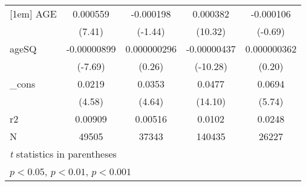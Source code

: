 \begin{table}[htbp]
\begin{tabular}{l*{4}{c}}
[1em]
AGE         &    0.000559\sym{***}&   -0.000198         &    0.000382\sym{***}&   -0.000106         \\
            &      (7.41)         &     (-1.44)         &     (10.32)         &     (-0.69)         \\
[1em]
ageSQ       & -0.00000899\sym{***}& 0.000000296         & -0.00000437\sym{***}& 0.000000362         \\
            &     (-7.69)         &      (0.26)         &    (-10.28)         &      (0.20)         \\
[1em]
\_cons      &      0.0219\sym{***}&      0.0353\sym{***}&      0.0477\sym{***}&      0.0694\sym{***}\\
            &      (4.58)         &      (4.64)         &     (14.10)         &      (5.74)         \\
\hline
r2          &     0.00909         &     0.00516         &      0.0102         &      0.0248         \\
N           &       49505         &       37343         &      140435         &       26227         \\
\hline\hline
\multicolumn{5}{l}{\footnotesize \textit{t} statistics in parentheses}\\
\multicolumn{5}{l}{\footnotesize \sym{*} \(p<0.05\), \sym{**} \(p<0.01\), \sym{***} \(p<0.001\)}\\
\end{tabular}
\end{table}
